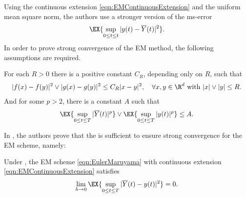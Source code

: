 Using the continuous extension \eqref{eqn:EMContinuousExtension}
and the uniform mean square norm, the authors use a stronger version of the ms-error%
$$
	\EX{\sup_{0\leq t \leq t}|y(t)-\overline{Y}(t)|^2}.
$$
%
In  order to prove strong convergence of the EM method, the following assumptions are required.
\begin{assumption}\label{ass:HighamAssumption}
	For each $R>0$ there is a positive constant $C_R$, depending only on $R$, such that
	\begin{equation}\label{ass:LipschitzCondition}
		|f(x)-f(y)|^2 \vee |g(x)-g(y)|^2 \leq C_R|x-y|^2,
		\quad
		\forall x,y\in \R^d 
		\text{ with } |x|\vee |y|\leq R.
	\end{equation}
	And for some $p>2$, there is a constant $A$ such that
	\begin{equation}
		\EX{\sup_{0\leq t\leq T}|\overline{Y}(t)|^p}
		\vee
		\EX{\sup_{0\leq t\leq T}|y(t)|^p} \leq A.
	\end{equation}
\end{assumption}
In \cite{Higham2002b}, the authors prove that the  is sufficient to ensure strong 
convergence for the EM scheme, namely: 
\begin{thm}\label{thm:HighamMaoStuart}
	Under , the EM scheme \eqref{eqn:EulerMaruyama} with continuous extension
	\eqref{eqn:EMContinuousExtension}
	satisfies
	\begin{equation}
		\lim_{h\to 0}
		\EX{\sup_{0\leq t\leq T}|\overline{Y}(t)-y(t)|^2}=0.
	\end{equation}
\end{thm}
	
